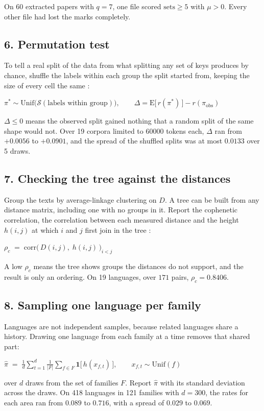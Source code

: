 On 60 extracted papers with \(q=7\), one file scored \(\mathrm{sets} \ge 5\) with \(\mu > 0\). Every other file had lost the marks completely.

\subsection{6. Permutation test}

To tell a real split of the data from what splitting any set of keys produces by chance, shuffle the labels within each group the split started from, keeping the size of every cell the same \cite{src:Good-2005}:

\(\pi^{\ast} \sim \mathrm{Unif}\bigl(\mathcal{S}(\text{labels within group})\bigr), \qquad \Delta = \mathrm{E}\bigl[\,r(\pi^{\ast})\,\bigr] - r(\pi_{\text{obs}})\)

\(\Delta \le 0\) means the observed split gained nothing that a random split of the same shape would not. Over 19 corpora limited to 60000 tokens each, \(\Delta\) ran from \(+0.0056\) to \(+0.0901\), and the spread of the shuffled splits was at most \(0.0133\) over 5 draws.

\subsection{7. Checking the tree against the distances}

Group the texts by average-linkage clustering on \(D\). A tree can be built from any distance matrix, including one with no groups in it. Report the cophenetic correlation, the correlation between each measured distance and the height \(h(i,j)\) at which \(i\) and \(j\) first join in the tree \cite{src:Sokal-and-Rohlf-1962}:

\(\rho_c \;=\; \mathrm{corr}\bigl(\,D(i,j),\; h(i,j)\,\bigr)_{i < j}\)

A low \(\rho_c\) means the tree shows groups the distances do not support, and the result is only an ordering. On 19 languages, over \(171\) pairs, \(\rho_c = 0.8406\).

\subsection{8. Sampling one language per family}

Languages are not independent samples, because related languages share a history. Drawing one language from each family at a time removes that shared part:

\(\hat{\pi} \;=\; \frac{1}{d}\sum_{t=1}^{d} \frac{1}{|F|}\sum_{f \in F} \mathbf{1}\bigl[\,h(x_{f,t})\,\bigr], \qquad x_{f,t} \sim \mathrm{Unif}(f)\)

over \(d\) draws from the set of families \(F\). Report \(\hat{\pi}\) with its standard deviation across the draws. On 418 languages in 121 families with \(d=300\), the rates for each area ran from \(0.089\) to \(0.716\), with a spread of \(0.029\) to \(0.069\).

